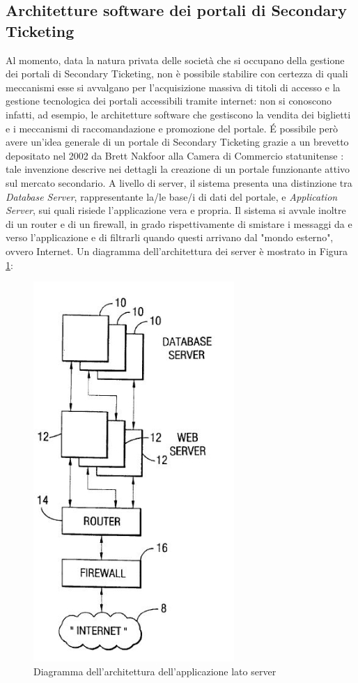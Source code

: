 \subsection{Architetture software dei portali di Secondary Ticketing}
Al momento, data la natura privata delle società che si occupano della gestione dei portali di Secondary Ticketing, non è possibile stabilire con certezza di quali meccanismi esse si avvalgano per l'acquisizione massiva di titoli di accesso e la gestione tecnologica dei portali accessibili tramite internet: non si conoscono infatti, ad esempio, le architetture software che gestiscono la vendita dei biglietti e i meccanismi di raccomandazione e promozione del portale. \'E possibile però avere un'idea generale di un portale di Secondary Ticketing grazie a un brevetto depositato nel 2002 da Brett Nakfoor alla Camera di Commercio statunitense \cite{nakfoor2002electronic}: tale invenzione descrive nei dettagli la creazione di un portale funzionante attivo sul mercato secondario. 
A livello di server, il sistema presenta una distinzione tra \textit{Database Server}, rappresentante la/le base/i di dati del portale, e \textit{Application Server}, sui quali risiede l'applicazione vera e propria. Il sistema si avvale inoltre di un router e di un firewall, in grado rispettivamente di smistare i messaggi da e verso l'applicazione e di filtrarli quando questi arrivano dal "mondo esterno", ovvero Internet. Un diagramma dell'architettura dei server è mostrato in Figura \ref{server}:
\begin{figure}[htbp]
	\centering
	\includegraphics[width=0.68\textwidth]{chapter2/immagini/brevetto_app}
	\caption{Diagramma dell'architettura dell'applicazione lato server}
	\label{server}
\end{figure}
